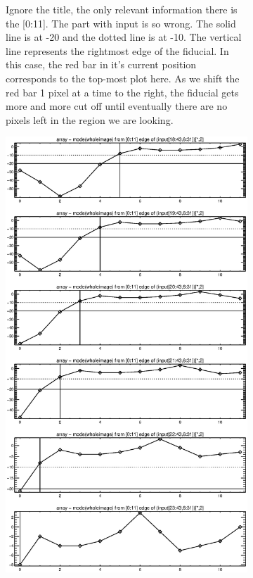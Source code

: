 \documentclass[10pt]{article}
\begin{document}
\begin{figure}[!h]
\begin{subfigure}[b]{.4\linewidth}
        \caption{Ignore the title, the only relevant information there is the [0:11]. The part with input is so wrong. The solid line is at -20 and the dotted line is at -10. The vertical line represents the rightmost edge of the fiducial. In this case, the red bar in it's current position corresponds to the top-most plot here. As we shift the red bar 1 pixel at a time to the right, the fiducial gets more and more cut off until eventually there are no pixels left in the region we are looking.}
        \label{primeone}
    \end{subfigure}
    \hspace{1.0in}
    \begin{subfigure}[b]{.4\linewidth}
        \centering
        \includegraphics[width=1.4\textwidth]{plots_tables_images/botleft1.eps} 

\end{subfigure}
\end{figure}
\end{document}

